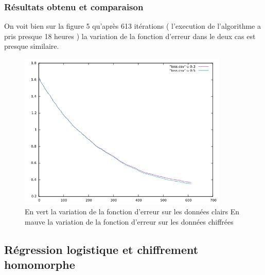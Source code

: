 \documentclass[a4paper,12pt]{article}
\begin{document}
  \subsubsection{Résultats obtenu et comparaison}
  On voit bien sur la figure 5 qu'après 613 itérations ( l'execution de l'algorithme a pris presque 18 heures ) la variation de la fonction d'erreur dans le deux cas est presque similaire.  
  \begin{figure}[h!]\begin{center}
    \includegraphics[width=10cm]{loss_linear_regression.png}
    \caption{En vert la variation de la fonction d'erreur sur les données clairs\newline
            En mauve la variation de la fonction d'erreur sur les données chiffrées}

    \label{fig:loss_linear}
  \end{center}
  \end{figure}
\newpage
  \subsection{Régression logistique et chiffrement homomorphe\cite{code_HE_logistic_reg}}
\end{document}
